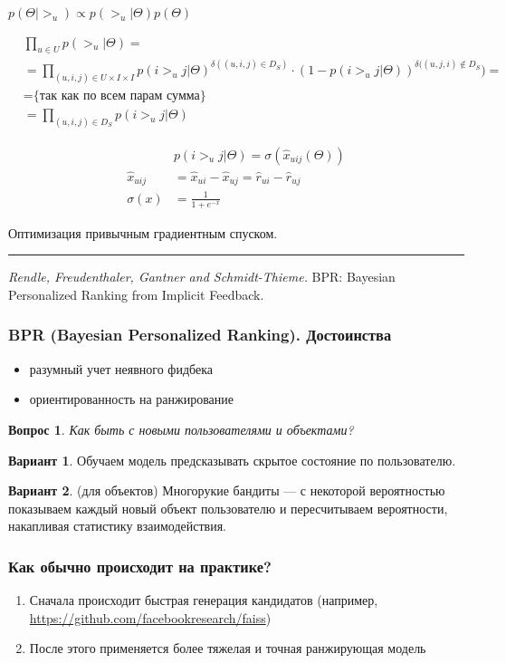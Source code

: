 \documentclass[fullscreen=true, bookmarks=true, hyperref={pdfencoding=unicode}]{beamer}
\newtheorem*{question}{Вопрос}
\begin{document}
\begin{frame}
  $ p(\Theta | >_u) \propto p(>_u | \Theta) p(\Theta) $

  \begin{align*}
    &\prod\limits_{u \in U} p(>_u | \Theta) = \\
    &= \prod\limits_{(u,i,j) \in U\times I\times I} p(i >_u j | \Theta)^{\delta((u,i,j) \in D_S)}\cdot(1-p(i >_u j | \Theta))^{\delta((u,j,i) \notin D_S}) = \\
    &=\text{\{так как по всем парам сумма\}} \\
    &= \prod\limits_{(u,i,j) \in D_S} p(i >_u j | \Theta)
  \end{align*}

  \begin{align*}
     &p(i >_u j | \Theta) = \sigma(\hat x_{uij}(\Theta)) \\
    \hat x_{uij} &= \hat x_{ui} - \hat x_{uj} = \hat r_{ui} - \hat r_{uj} \\
    \sigma(x) &= \frac{1}{1 + e^{-x}}
  \end{align*}

  Оптимизация привычным градиентным спуском.

  \noindent\rule{8cm}{0.4pt}

  {\small
  {\it Rendle, Freudenthaler, Gantner and Schmidt-Thieme.} BPR: Bayesian Personalized Ranking from Implicit Feedback.}
\end{frame}


\begin{frame}
  \frametitle{BPR (Bayesian Personalized Ranking). Достоинства}

  \begin{itemize}
    \item разумный учет неявного фидбека
    \item ориентированность на ранжирование
  \end{itemize}
  \pause
  \begin{question}
    Как быть с новыми пользователями и объектами?
  \end{question}
  \pause
  {\bf Вариант 1}. Обучаем модель предсказывать скрытое состояние по пользователю.

  {\bf Вариант 2}. (для объектов) Многорукие бандиты — с некоторой вероятностью показываем каждый новый объект пользователю и пересчитываем вероятности, накапливая статистику взаимодействия.
\end{frame}


\begin{frame}
  \frametitle{Как обычно происходит на практике?}

  \begin{enumerate}
    \item Сначала происходит быстрая генерация кандидатов (например, \href{https://github.com/facebookresearch/faiss}{https://github.com/facebookresearch/faiss})
    \item После этого применяется более тяжелая и точная ранжирующая модель
  \end{enumerate}
\end{frame}
\end{document}
